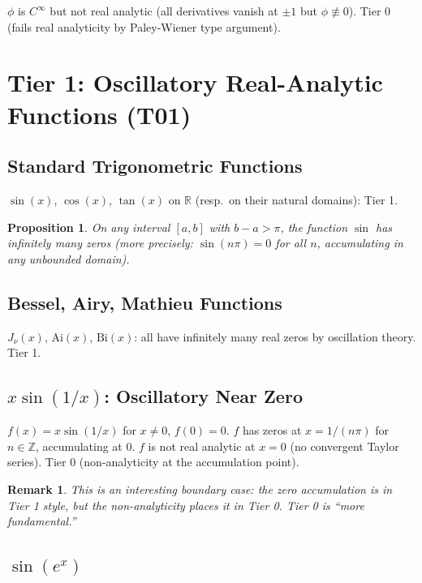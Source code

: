 \documentclass[11pt]{article}
\newtheorem{proposition}[theorem]{Proposition}
\newtheorem{remark}[theorem]{Remark}
\begin{document}
$\phi$ is $C^\infty$ but not real analytic (all derivatives vanish at $\pm1$ but $\phi\not\equiv0$).
Tier 0 (fails real analyticity by Paley-Wiener type argument).

\section{Tier 1: Oscillatory Real-Analytic Functions (T01)}

\subsection{Standard Trigonometric Functions}

$\sin(x)$, $\cos(x)$, $\tan(x)$ on $\mathbb{R}$ (resp.\ on their natural domains): Tier 1.

\begin{proposition}
On any interval $[a,b]$ with $b-a>\pi$, the function $\sin$ has infinitely many zeros
(more precisely: $\sin(n\pi)=0$ for all $n$, accumulating in any unbounded domain).
\end{proposition}

\subsection{Bessel, Airy, Mathieu Functions}

$J_\nu(x)$, $\mathrm{Ai}(x)$, $\mathrm{Bi}(x)$: all have infinitely many real zeros by
oscillation theory. Tier 1.

\subsection{$x\sin(1/x)$: Oscillatory Near Zero}

$f(x)=x\sin(1/x)$ for $x\neq0$, $f(0)=0$.
$f$ has zeros at $x=1/(n\pi)$ for $n\in\mathbb{Z}$, accumulating at $0$.
$f$ is not real analytic at $x=0$ (no convergent Taylor series).
Tier 0 (non-analyticity at the accumulation point).

\begin{remark}
This is an interesting boundary case: the zero accumulation is in Tier 1 style, but
the non-analyticity places it in Tier 0. Tier 0 is ``more fundamental.''
\end{remark}

\subsection{$\sin(e^x)$}
\end{document}
